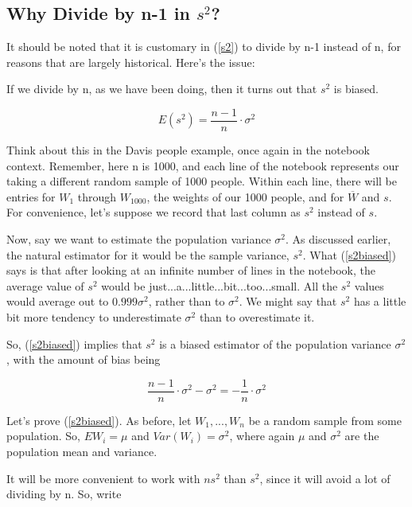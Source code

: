 \subsection{Why Divide by n-1 in $s^2$?}  
\label{whynot}

It should be noted that it is customary in (\ref{s2}) to divide by n-1
instead of n, for reasons that are largely historical.  Here's the
issue:

If we divide by n, as we have been doing, then it turns out that
$s^2$ is biased.

\begin{equation}
\label{s2biased}
E(s^2) = \frac{n-1}{n} \cdot \sigma^2
\end{equation}

Think about this in the Davis people example, once again in the notebook
context.  Remember, here n is 1000, and each line of the notebook
represents our taking a different random sample of 1000 people.  Within
each line, there will be entries for  $W_1$ through $W_{1000}$, the
weights of our 1000 people, and for $\overline{W}$ and $s$.  For convenience,
let's suppose we record that last column as $s^2$ instead of $s$.

Now, say we want to estimate the population variance $\sigma^2$.  As
discussed earlier, the natural estimator for it would be the sample
variance, $s^2$.  What (\ref{s2biased}) says is that after looking at an
infinite number of lines in the notebook, the average value of $s^2$
would be just...a...little...bit...too...small.  All the $s^2$ values
would average out to $0.999 \sigma^2$, rather than to $\sigma^2$.  We
might say that $s^2$ has a little bit more tendency to underestimate 
$\sigma^2$ than to overestimate it.

So, (\ref{s2biased}) implies that $s^2$ is a biased estimator of the
population variance $\sigma^2$, with the amount of bias being

\begin{equation}
\frac{n-1}{n} \cdot \sigma^2 - \sigma^2 = -\frac{1}{n} \cdot \sigma^2
\end{equation}

Let's prove (\ref{s2biased}).  As before, let $W_1,...,W_n$ be a random
sample from some population.  So, $EW_i = \mu$ and $Var(W_i) =
\sigma^2$, where again $\mu$ and $\sigma^2$ are the population mean and
variance.

It will be more convenient to work with $ns^2$ than $s^2$, since it will
avoid a lot of dividing by n.  So, write

